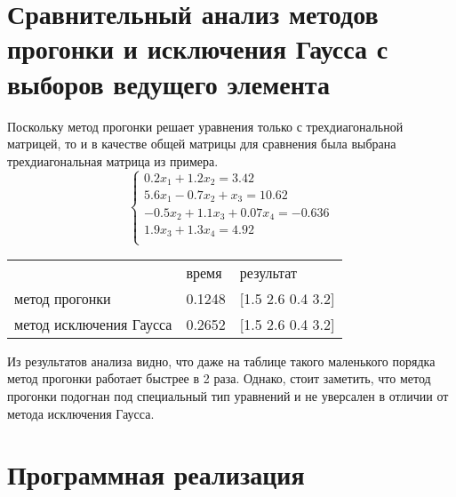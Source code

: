 \documentclass{article}
\begin{document}
 \section{Сравнительный анализ методов прогонки и исключения Гаусса с
выборов ведущего элемента}
Поскольку метод прогонки решает уравнения только с трехдиагональной матрицей,
то и в качестве общей матрицы для сравнения была выбрана трехдиагональная
матрица из примера.
\begin{displaymath}
  \left\{ \begin{array}{ll}
  0.2x_{1} + 1.2x_{2} = 3.42\\
  5.6x_{1} - 0.7x_{2} + x_{3} = 10.62\\
  -0.5x_{2} + 1.1x_{3} + 0.07x_{4} = -0.636\\
  1.9x_{3} + 1.3x_{4} = 4.92\\
\end{array} \right.
\end{displaymath}
\begin{table}
\begin{tabular}{lll}
~                       & время  & результат \\
метод прогонки          & 0.1248 & [1.5 2.6 0.4 3.2]\\
метод исключения Гаусса & 0.2652 & [1.5 2.6 0.4 3.2]\\
\end{tabular}
\end{table}
Из результатов анализа видно, что даже на таблице такого маленького порядка
метод прогонки работает быстрее в 2 раза.
Однако, стоит заметить, что метод прогонки подогнан под специальный тип
уравнений и не уверсален в отличии от метода исключения Гаусса.
\section{Программная реализация}
\end{document}
